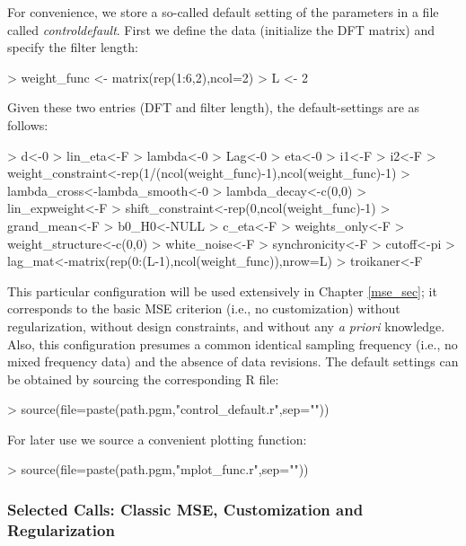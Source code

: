 \documentclass[a4paper]{book}
\begin{document}
For convenience, we store a so-called default setting of the parameters in a file called \emph{control\textunderscore default}.
 First we define the data (initialize the DFT matrix) and specify the filter  length:
\begin{Schunk}
\begin{Sinput}
> weight_func <- matrix(rep(1:6,2),ncol=2)
> L <- 2
\end{Sinput}
\end{Schunk}
Given these two entries (DFT and filter length), the default-settings are as follows:
\begin{Schunk}
\begin{Sinput}
> d<-0
> lin_eta<-F
> lambda<-0
> Lag<-0
> eta<-0
> i1<-F
> i2<-F
> weight_constraint<-rep(1/(ncol(weight_func)-1),ncol(weight_func)-1)
> lambda_cross<-lambda_smooth<-0
> lambda_decay<-c(0,0)
> lin_expweight<-F
> shift_constraint<-rep(0,ncol(weight_func)-1)
> grand_mean<-F
> b0_H0<-NULL
> c_eta<-F
> weights_only<-F
> weight_structure<-c(0,0)
> white_noise<-F
> synchronicity<-F
> cutoff<-pi
> lag_mat<-matrix(rep(0:(L-1),ncol(weight_func)),nrow=L)
> troikaner<-F
\end{Sinput}
\end{Schunk}
This particular configuration will be used extensively in Chapter \ref{mse_sec}; it corresponds to the basic MSE criterion 
 (i.e., no customization) without regularization, without design constraints, and without any {\em a priori} knowledge.
  Also, this configuration presumes a   common identical sampling frequency (i.e., no mixed frequency data)
 and the absence of data revisions. The default settings can be obtained by sourcing the corresponding R file:

\begin{Schunk}
\begin{Sinput}
> source(file=paste(path.pgm,"control_default.r",sep=""))
\end{Sinput}
\end{Schunk}
For later use we   source a convenient plotting function:
\begin{Schunk}
\begin{Sinput}
> source(file=paste(path.pgm,"mplot_func.r",sep=""))
\end{Sinput}
\end{Schunk}

\subsubsection{Selected Calls: Classic MSE, Customization and Regularization}
\end{document}

